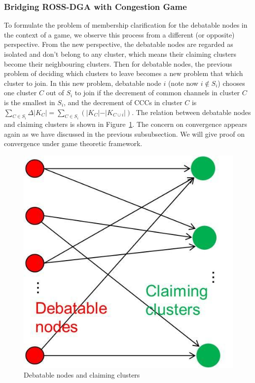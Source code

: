 \documentclass[10pt,journal,compsoc]{IEEEtran}
\theoremstyle{mytheoremstyle}
\theoremstyle{mytheoremstyle}
\theoremstyle{mytheoremstyle}
\begin{document}
\subsubsection{Bridging ROSS-DGA with Congestion Game}
\label{clustering:phaseII:game}
To formulate the problem of membership clarification for the debatable nodes in the context of a game, we observe this process from a different (or opposite) perspective. 
From the new perspective, the debatable nodes are regarded as isolated and don't belong to any cluster, which means their claiming clusters become their neighbouring clusters. 
Then for debatable nodes, the previous problem of deciding which clusters to leave becomes a new problem that which cluster to join.
In this new problem, debatable node $i$ (note now $i\notin S_i$) chooses one cluster $C$ out of $S_i$ to join if the decrement of common channels in cluster $C$ is the smallest in $S_i$, and the decrement of CCCs in cluster $C$ is $\sum_{C\in S_i}\Delta\vert K_C \vert=\sum_{C\in S_i}({\vert K_{C} \vert-\vert K_{C\cup i} \vert})$.
The relation between debatable nodes and claiming clusters is shown in Figure~\ref{debatable_nodes_claiming_cluster}.
The concern on convergence appears again as we have discussed in the previous subsubsection.
We will give proof on convergence under game theoretic framework.
\begin{figure}[ht!]
  \centering
  \includegraphics[width=0.25\linewidth]{singletongame_png.png}
  \caption{Debatable nodes and claiming clusters}
  \label{debatable_nodes_claiming_cluster}
\end{figure}
\end{document}
